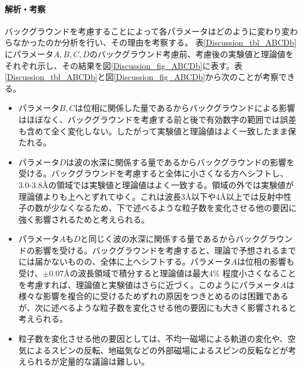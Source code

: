 \paragraph{解析・考察}
バックグラウンドを考慮することによって各パラメータはどのように変わり変わらなかったのか分析を行い、その理由を考察する。
表\ref{Discussion_tbl_ABCDb}にパラメータ$A,B,C,D$のバックグラウンド考慮前、考慮後の実験値と理論値をそれぞれ示し、その結果を図\ref{Discussion_fig_ABCDb}に表す。表\ref{Discussion_tbl_ABCDb}と図\ref{Discussion_fig_ABCDb}から次のことが考察できる。
\begin{itemize}
\item パラメータ$B,C$は位相に関係した量であるからバックグラウンドによる影響はほぼなく、バックグラウンドを考慮する前と後で有効数字の範囲では誤差も含めて全く変化しない。したがって実験値と理論値はよく一致したまま保たれる。
\item パラメータ$D$は波の水深に関係する量であるからバックグラウンドの影響を受ける。バックグラウンドを考慮すると全体に小さくなる方へシフトし、3.0-3.8\AA の領域では実験値と理論値はよく一致する。領域の外では実験値が理論値よりも上へとずれてゆく。これは波長3\AA 以下や4\AA 以上では反射中性子の数が少なくなるため、下で述べるような粒子数を変化させる他の要因に強く影響されるためと考えられる。
\item パラメータ$A$も$D$と同じく波の水深に関係する量であるからバックグラウンドの影響を受ける。バックグラウンドを考慮すると、理論で予想されるまでには届かないものの、全体に上へシフトする。パラメータ$A$は位相の影響も受け、$\pm 0.07$\AA の波長領域で積分すると理論値は最大4\% 程度小さくなることを考慮すれば、理論値と実験値はさらに近づく。このようにパラメータ$A$は様々な影響を複合的に受けるためずれの原因をつきとめるのは困難であるが、次に述べるような粒子数を変化させる他の要因にも大きく影響されると考えられる。
\item 粒子数を変化させる他の要因としては、不均一磁場による軌道の変化や、空気によるスピンの反転、地磁気などの外部磁場によるスピンの反転などが考えられるが定量的な議論は難しい。
\end{itemize}

